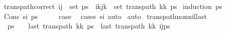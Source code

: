 \begin{isabellebody}
\ trans{\isacharunderscore}{\kern0pt}path{\isacharunderscore}{\kern0pt}correct{\isacharcolon}{\kern0pt}\ {\isachardoublequoteopen}{\isacharparenleft}{\kern0pt}i{\isacharcomma}{\kern0pt}j{\isacharparenright}{\kern0pt}\ {\isasymin}\ set\ ps\ {\isasymlongleftrightarrow}\ {\isacharparenleft}{\kern0pt}i{\isacharplus}{\kern0pt}kj{\isacharplus}{\kern0pt}k\ {\isasymin}\ set\ {\isacharparenleft}{\kern0pt}trans{\isacharunderscore}{\kern0pt}path\ {\isacharparenleft}{\kern0pt}kk\ ps{\isacharparenright}{\kern0pt}{\isachardoublequoteclose}\isanewline
%
\isadelimproof
%
\endisadelimproof
%
\isatagproof
{}\isamarkupfalse%
\ {\isacharparenleft}{\kern0pt}induction\ ps{\isacharparenright}{\kern0pt}\isanewline
\ \ \isamarkupfalse%
\ {\isacharparenleft}{\kern0pt}Cons\ s\isactrlsub i\ ps{\isacharparenright}{\kern0pt}\isanewline
\ \ \isamarkupfalse%
\ \isamarkupfalse%
\ {\isacharquery}{\kern0pt}case\ \isamarkupfalse%
\ {\isacharparenleft}{\kern0pt}cases\ s\isactrlsub i{\isacharparenright}{\kern0pt}\ auto\isanewline
{}\isamarkupfalse%
\ auto%
\endisatagproof
{\isafoldproof}%
%
\isadelimproof
\isanewline
%
\endisadelimproof
\isanewline
{}\isamarkupfalse%
\ trans{\isacharunderscore}{\kern0pt}path{\isacharunderscore}{\kern0pt}non{\isacharunderscore}{\kern0pt}nil{\isacharunderscore}{\kern0pt}last{\isacharcolon}{\kern0pt}\ \isanewline
\ \ {\isachardoublequoteopen}ps\ {\isasymnoteq}\ {\isacharbrackleft}{\kern0pt}{\isacharbrackright}{\kern0pt}\ {\isasymLongrightarrow}\ last\ {\isacharparenleft}{\kern0pt}trans{\isacharunderscore}{\kern0pt}path\ {\isacharparenleft}{\kern0pt}kk\ ps{\isacharparenright}{\kern0pt}\ {\isacharequal}{\kern0pt}\ last\ {\isacharparenleft}{\kern0pt}trans{\isacharunderscore}{\kern0pt}path\ {\isacharparenleft}{\kern0pt}kk\ {\isacharparenleft}{\kern0pt}{\isacharparenleft}{\kern0pt}i{\isacharcomma}{\kern0pt}j{\isacharparenright}{\kern0pt}{\isacharhash}{\kern0pt}ps{\isacharparenright}{\kern0pt}{\isacharparenright}{\kern0pt}{\isachardoublequoteclose}\isanewline
%
\isadelimproof
\ \ %
\endisadelimproof
%
\isatagproof
{}\isamarkupfalse%

\end{isabellebody}
